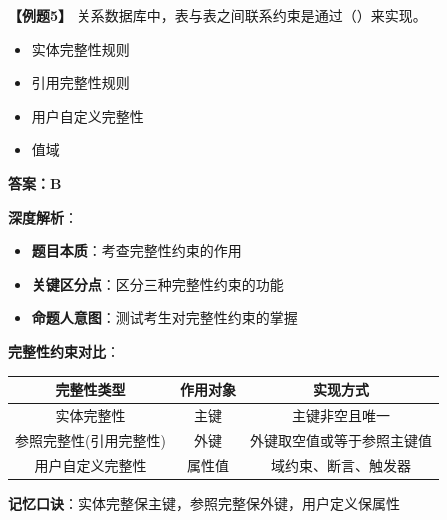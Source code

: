 \documentclass[12pt, a4paper]{article}
\newenvironment{bluebox}[1]{%
  \begin{trivlist}
  \item[\hskip\labelsep \textbf{#1}]
  \setlength{\parskip}{0.5ex}
  \setlength{\itemsep}{0.5ex}
}{%
  \end{trivlist}
}
\begin{document}
\begin{bluebox}{例题5：参照完整性}
	\textbf{【例题5】} 关系数据库中，表与表之间联系约束是通过（\quad）来实现。

	\begin{itemize}
		\item[A)] 实体完整性规则
		\item[B)] 引用完整性规则
		\item[C)] 用户自定义完整性
		\item[D)] 值域
	\end{itemize}

	\textbf{答案：B}

	\textbf{深度解析}：

	\begin{itemize}
		\item \textbf{题目本质}：考查完整性约束的作用
		\item \textbf{关键区分点}：区分三种完整性约束的功能
		\item \textbf{命题人意图}：测试考生对完整性约束的掌握
	\end{itemize}

	\textbf{完整性约束对比}：

	\begin{tabular}{|c|c|c|}
		\hline
		\textbf{完整性类型} & \textbf{作用对象} & \textbf{实现方式} \\
		\hline
		实体完整性          & 主键            & 主键非空且唯一       \\
		\hline
		参照完整性(引用完整性)   & 外键            & 外键取空值或等于参照主键值 \\
		\hline
		用户自定义完整性       & 属性值           & 域约束、断言、触发器    \\
		\hline
	\end{tabular}

	\textbf{记忆口诀}：实体完整保主键，参照完整保外键，用户定义保属性
\end{bluebox}
\end{document}
